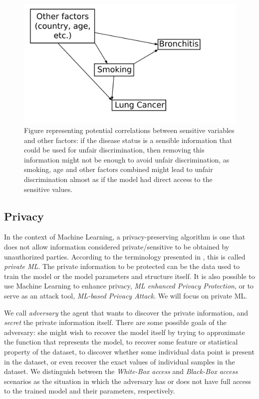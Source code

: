 \documentclass[conference]{IEEEtran}
\begin{document}
\begin{figure}[ht]
\centering
\includegraphics[width=\columnwidth]{correlated}
\caption{Figure representing potential correlations between sensitive variables and other factors: if the disease status is a sensible information that could be used for unfair discrimination, then removing this information might not be enough to avoid unfair discrimination, as smoking, age and other factors combined might lead to unfair discrimination almost as if the model had direct access to the sensitive values.}\label{fig:correlated}
\end{figure}


\subsection{Privacy}

In the context of Machine Learning, a privacy-preserving algorithm is one that does not allow information considered private/sensitive to be obtained by unauthorized parties. According to the terminology presented in \cite{liu2021machine}, this is called \emph{private ML}. The private information to be protected can be the data used to train the model or the model parameters and structure itself. It is also possible to use Machine Learning to enhance privacy, \emph{ML enhanced Privacy Protection}, or to serve as an attack tool, \emph{ML-based Privacy Attack}. We will focus on private ML.

We call \emph{adversary} the agent that wants to discover the private information, and \emph{secret} the private information itself. There are some possible goals of the adversary: she might wish to recover the model itself by trying to approximate the function that represents the model, to recover some feature or statistical property of the dataset, to discover whether some individual data point is present in the dataset, or even recover the exact values of individual samples in the dataset. We distinguish between the \emph{White-Box access} and \emph{Black-Box access} scenarios as the situation in which the adversary has or does not have full access to the trained model and their parameters, respectively. 
\end{document}
